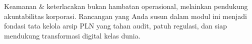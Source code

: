 \documentclass[12pt,a4paper]{report}
\begin{document}
\vspace{1cm}
\begin{plnbox}[Penutup]
Keamanan \& keterlacakan bukan hambatan operasional, melainkan pendukung akuntabilitas korporasi. Rancangan yang Anda susun dalam modul ini menjadi fondasi tata kelola arsip PLN yang tahan audit, patuh regulasi, dan siap mendukung transformasi digital kelas dunia.
\end{plnbox}
\end{document}
